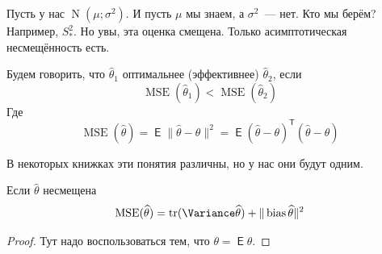 \documentclass{article}
\DeclareMathOperator{\Expected}{\mathsf{E}}
\begin{document}
    \begin{example}
        Пусть у нас $\operatorname{N}(\mu;\sigma^2)$. И пусть $\mu$ мы знаем, а $\sigma^2$~--- нет. Кто мы берём? Например, $S_*^2$. Но увы, эта оценка смещена. Только асимптотическая несмещённость есть.
    \end{example}
    \begin{definition}
        Будем говорить, что $\widehat{\theta}_1$ оптимальнее (эффективнее) $\widehat{\theta}_2$, если
        \[
        \operatorname{MSE}(\widehat{\theta}_1)<\operatorname{MSE}(\widehat{\theta}_2)
        \]
        Где
        \[
        \operatorname{MSE}(\widehat{\theta})=\Expected\|\widehat\theta-\theta\|^2=\Expected(\widehat\theta-\theta)^{\mathsf T}(\widehat\theta-\theta)
        \]
    \end{definition}
    \begin{remark}
        В некоторых книжках эти понятия различны, но у нас они будут одним.
    \end{remark}
    \begin{claim}
        Если $\widehat{\theta}$ несмещена
        \[
        \operatorname{MSE}(\widehat{\theta})=\tr(\Variance\widehat{\theta})+\|\operatorname{bias}\widehat{\theta}\|^2
        \]
    \end{claim}
    \begin{proof}
        Тут надо воспользоваться тем, что $\theta=\Expected\widehat{\theta}$.
    \end{proof}
\end{document}
